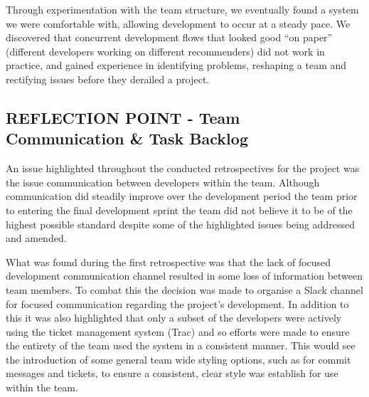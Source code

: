 \documentclass{l3proj}
\begin{document}
Through experimentation with the team structure, we eventually found a system we were comfortable with, allowing development to occur at a steady pace. We discovered that concurrent development flows that looked good “on paper” (different developers working on different recommenders) did not work in practice, and gained experience in identifying problems, reshaping a team and rectifying issues before they derailed a project. 

\subsection{REFLECTION POINT - Team Communication \& Task Backlog}
\label{sec:communication}






An issue highlighted throughout the conducted retrospectives for the project was the issue communication between developers within the team. Although communication did steadily improve over the development period the team prior to entering the final development sprint the team did not believe it to be of the highest possible standard despite some of the highlighted issues being addressed and amended. 

What was found during the first retrospective was that the lack of focused development communication channel resulted in some loss of information between team members. To combat this the decision was made to organise a Slack channel for focused communication regarding the project's development. In addition to this it was also highlighted that only a subset of the developers were actively using the ticket management system (Trac) and so efforts were made to ensure the entirety of the team used the system in a consistent manner. This would see the introduction of some general team wide styling options, such as for commit messages and tickets, to ensure a consistent, clear style was  establish for use within the team. 
\end{document}
